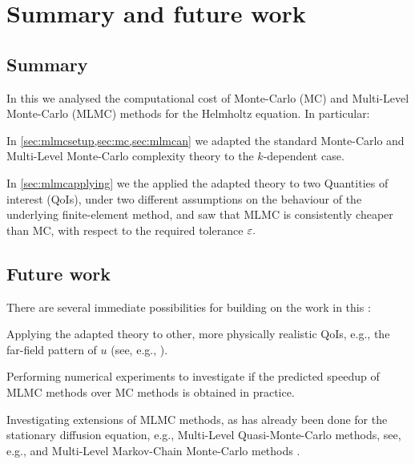 \section{Summary and future work}

\subsection{Summary}
In this  we analysed the computational cost of Monte-Carlo (MC) and Multi-Level Monte-Carlo (MLMC) methods for the Helmholtz equation. In particular:
\bit
\item In \cref{sec:mlmcsetup,sec:mc,sec:mlmcan} we adapted the standard Monte-Carlo and Multi-Level Monte-Carlo complexity theory to the $k$-dependent case.
  \item In \cref{sec:mlmcapplying} we the applied the adapted theory to two Quantities of interest (QoIs), under two different assumptions on the behaviour of the underlying finite-element method, and saw that MLMC is consistently cheaper than MC, with respect to the required tolerance $\varepsilon.$
\eit

\subsection{Future work}
There are several immediate possibilities for building on the work in this :
\bit
\item Applying the adapted theory to other, more physically realistic QoIs, e.g., the far-field pattern of $u$ (see, e.g., \cite[Section 2.5]{CoKr:13}).
\item Performing numerical experiments to investigate if the predicted speedup of MLMC methods over MC methods is obtained in practice.
  \item Investigating extensions of MLMC methods, as has already been done for the stationary diffusion equation, e.g., Multi-Level Quasi-Monte-Carlo methods, see, e.g., \cite{KuScScSlUl:17} and Multi-Level Markov-Chain Monte-Carlo methods \cite{DoKeScTe:15}.
\eit
